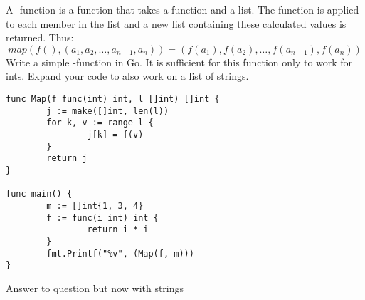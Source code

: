 \begin{Exercise}[title={Map function},difficulty=4]
\label{ex:map function}
A -function is a function that takes
a function and a list. The function is applied to 
each member in the list and a new list containing
these calculated values is returned.
Thus: 
$$ map(f(), (a_1,a_2,\ldots,a_{n-1},a_n)) =  (f(a_1), f(a_2),\ldots,f(a_{n-1}), f(a_n)) $$
\Question \label{ex:map function q1} Write a simple
-function in Go. It is sufficient
for this function only to work for ints.
\Question \label{ex:map function q2} Expand your code to also work on a list of strings.

\end{Exercise}

\begin{Answer}

\Question 
\begin{lstlisting}[caption=A \func{Map} function]
func Map(f func(int) int, l []int) []int {
        j := make([]int, len(l))
        for k, v := range l {
                j[k] = f(v)
        }
        return j
}

func main() {
        m := []int{1, 3, 4}
        f := func(i int) int {
                return i * i
        }
        fmt.Printf("%v", (Map(f, m)))
}
\end{lstlisting}

\Question Answer to question but now with strings
\end{Answer}



